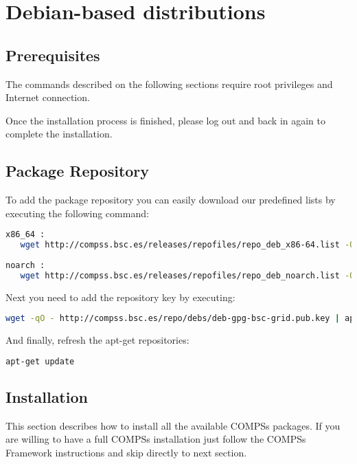 \section{Debian-based distributions}
\label{sec:Debian}


\subsection{Prerequisites}
The commands described on the following sections require root privileges and Internet connection.

Once the installation process is finished, please log out and back in again to complete the installation. 

\subsection{Package Repository}
To add the package repository you can easily download our predefined lists by executing the following command:
\begin{lstlisting}[language=bash]
x86_64 :
   wget http://compss.bsc.es/releases/repofiles/repo_deb_x86-64.list -O /etc/apt/sources.list.d/compss-framework_x86-64.list
   
noarch :
   wget http://compss.bsc.es/releases/repofiles/repo_deb_noarch.list -O /etc/apt/sources.list.d/compss-framework_noarch.list
\end{lstlisting}

Next you need to add the repository key by executing:
\begin{lstlisting}[language=bash]
wget -qO - http://compss.bsc.es/repo/debs/deb-gpg-bsc-grid.pub.key | apt-key add -
\end{lstlisting}

And finally, refresh the apt-get repositories:
\begin{lstlisting}[language=bash]
apt-get update
\end{lstlisting}

\subsection{Installation}
This section describes how to install all the available COMPSs packages. If you are willing to have a full COMPSs installation 
just follow the COMPSs Framework instructions and skip directly to next section.

